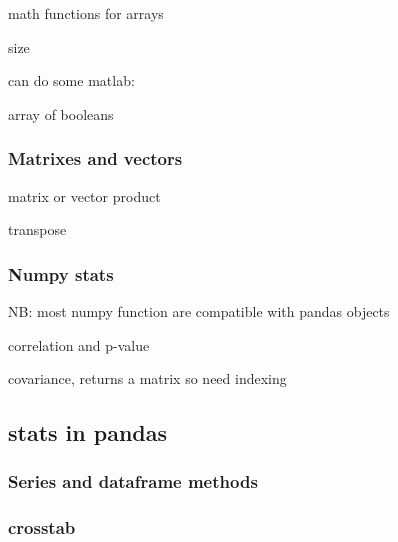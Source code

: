 			 math functions for arrays


			 size

			can do some matlab:


			 array of booleans


		\subsubsection{Matrixes and vectors}


			 matrix or vector product

			 transpose

		\subsubsection{Numpy stats}

			NB: most numpy function are compatible with pandas objects
			


			 correlation and p-value

			 covariance, returns a matrix so need indexing


	\subsection{stats in pandas}
		
		\subsubsection{Series and dataframe methods}






		\subsubsection{crosstab}
			\label{stats:panda:crosstab}

